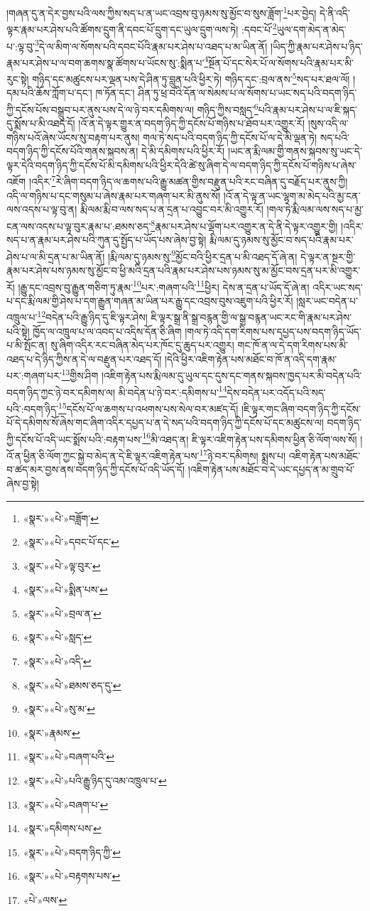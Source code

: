 །གཞན་དུ་ན་དེར་བྱས་པའི་ལས་ཀྱིས་སད་པ་ན་ཡང་འབྲས་བུ་ཉམས་སུ་མྱོང་བ་སུས་ཟློག་\footnote{«སྣར་»«པེ་»བཟློག་}པར་བྱེད། དེ་ནི་འདི་ལྟར་རྣམ་པར་ཤེས་པའི་ཚོགས་དྲུག་ནི་དབང་པོ་དྲུག་དང་ཡུལ་དྲུག་ལས་ཏེ། :དབང་པོ་\footnote{«སྣར་»«པེ་»དབང་པོ་དང་}ཡུལ་དག་མེད་ན་མེད་པ་:ལྟ་བུ་\footnote{«སྣར་»«པེ་»ལྟ་བུར་}དེ་ལ་མིག་ལ་སོགས་པའི་དབང་པོའི་རྣམ་པར་ཤེས་པ་འཐད་པ་མ་ཡིན་ནོ། །ཡིད་ཀྱི་རྣམ་པར་ཤེས་པ་ཉིད་རྣམ་པར་ཤེས་པ་ལ་བག་ཆགས་སྣ་ཚོགས་པ་ཡོངས་སུ་:སྨིན་པ་\footnote{«སྣར་»«པེ་»སྨིན་པས་}སྔོན་པོ་དང་སེར་པོ་ལ་སོགས་པའི་རྣམ་པར་མི་རུང་སྟེ། གཉིད་དང་མཚུངས་པར་ལྡན་པས་དེ་ཤིན་ཏུ་བླུན་པའི་ཕྱིར་ཏེ། གཉིད་དང་:བྲལ་ནས་\footnote{«སྣར་»«པེ་»བྲལ་ན་}སད་པར་ཐལ་ལོ། །དམ་པའི་ཆོས་ཀློག་པ་དང་། ཁ་ཏོན་དང་། ཤིན་ཏུ་ཕྲ་བའི་དོན་ལ་སེམས་པ་ལ་སོགས་པ་ཡང་སད་པའི་བདག་ཉིད་ཀྱི་དངོས་པོས་བསྒྲུབ་པར་ནུས་པས་དེ་ལ་ཉེ་བར་དམིགས་ལ། གཉིད་ཀྱིས་བསླད་\footnote{«སྣར་»«པེ་»སླད་}པའི་རྣམ་པར་ཤེས་པ་ལ་ཇི་སྐད་དུ་སྨོས་པ་མི་འཐད་དོ། །འོ་ན་དེ་ལྟར་གྱུར་ན་བདག་ཉིད་ཀྱི་དངོས་པོ་གཉིས་པ་ཐོབ་པར་འགྱུར་རོ། །སུས་འདི་ལ་གཉིས་པའོ་ཞེས་ཡོངས་སུ་བརྟག་པར་ནུས། གལ་ཏེ་སད་པའི་བདག་ཉིད་ཀྱི་དངོས་པོ་ལ་དེ་མི་ལྡན་ཏེ། སད་པའི་བདག་ཉིད་ཀྱི་དངོས་པོའི་གནས་སྐབས་ན། དེ་མི་དམིགས་པའི་ཕྱིར་རོ། །ཡང་ན་རྨི་ལམ་གྱི་གནས་སྐབས་སུ་ཡང་དེ་ལྟར་དེའི་བདག་ཉིད་ཀྱི་དངོས་པོ་མི་དམིགས་པའི་ཕྱིར་དེའི་ཚེ་སུ་ཞིག་དེ་ལ་བདག་ཉིད་ཀྱི་དངོས་པོ་གཉིས་པ་ཞེས་འཇོག །འདིར་\footnote{«སྣར་»«པེ་»འདི་}རེ་ཞིག་བདག་ཉིད་ལ་ཆགས་པའི་རྒྱུ་མཚན་གྱིས་བརྫུན་པའི་རང་བཞིན་དུ་བརྗོད་པར་ནུས་ཀྱི། འདི་ལ་གཉིས་པ་དང་གསུམ་པ་ཞེས་རྣམ་པར་གཞག་པར་མི་ནུས་སོ། །འོ་ན་དེ་ལྟ་ན་ཡང་ལྷག་མ་མེད་པའི་མྱ་ངན་ལས་འདས་པ་ལྟ་བུ་ན། རྨི་ལམ་རྨི་བ་ལས་སད་པ་ན་དྲན་པ་འབྱུང་བར་མི་འགྱུར་རོ། །གལ་ཏེ་རྨི་ལམ་ལས་སད་པ་མྱ་ངན་ལས་འདས་པ་ལྟ་བུར་རྣམ་པ་:ཐམས་ཅད་\footnote{«སྣར་»«པེ་»ཐམས་ཅད་དུ་}རྣམ་པར་ཤེས་པ་ལྡོག་པར་འགྱུར་ན་དེ་ནི་དེ་ལྟར་འགྱུར་གྱི། །འདིར་སད་པ་ན་རྣམ་པར་ཤེས་པའི་ཀུན་དུ་སྤྱོད་པ་ཡོད་པས་ཞེས་བྱ་སྟེ། རྨི་ལམ་དུ་ཉམས་སུ་མྱོང་བ་སད་པའི་རྣམ་པར་ཤེས་པ་ལ་མི་དྲན་པ་མ་ཡིན་ནོ། །རྨི་ལམ་དུ་ཉམས་སུ་\footnote{«སྣར་»«པེ་»སུ་མ་}མྱོང་བའི་ཕྱིར་དྲན་པ་མི་འཐད་དོ་ཞེ་ན། དེ་ལྟར་ན་སྔར་གྱི་རྣམ་པར་ཤེས་པས་ཉམས་སུ་མྱོང་བ་ཕྱི་མའི་དྲན་པའི་རྣམ་པར་ཤེས་པས་ཉམས་སུ་མ་མྱོང་བས་དྲན་པར་མི་འགྱུར་རོ། །རྒྱུ་དང་འབྲས་བུ་རྒྱུན་གཅིག་ཏུ་རྣམ་\footnote{«སྣར་»རྣམས་}པར་:གཞག་པའི་\footnote{«སྣར་»«པེ་»བཞག་པའི་}ཕྱིར། དེས་ན་དྲན་པ་ཡོད་དོ་ཞེ་ན། འདིར་ཡང་སད་པ་དང་རྨི་ལམ་གྱི་ཤེས་པ་དག་རྒྱུན་གཞན་མ་ཡིན་པར་རྒྱུ་དང་འབྲས་བུས་འཇུག་པའི་ཕྱིར་རོ། །སླར་ཡང་བདེན་པ་འཁྲུལ་པ་\footnote{«སྣར་»«པེ་»པའི་རྒྱུ་ཉིད་དུ་འམ་འཁྲུལ་པ་}བདེན་པའི་རྒྱུ་ཉིད་དུ་ཇི་ལྟར་ཤེས། ཇི་ལྟར་སྒྲ་ནི་སྒྲ་བརྙན་གྱི་ལ་སྒྲ་བརྙན་ཡང་རང་གི་རྣམ་པར་ཤེས་པའི་སྟེ། ཁྱོད་ལ་འཁྲུལ་པ་ལ་འབད་པ་འདིས་དོན་ཅི་ཞིག །གལ་ཏེ་འདི་དག་རིགས་པས་དཔྱད་པས་བདག་ཉིད་ཡོད་པ་མི་སྤོང་ན། སུ་ཞིག་འདིར་རང་བཞིན་མེད་པར་ཁོང་དུ་ཆུད་པར་འགྱུར། གང་ཁོ་ན་ལ་དེ་དག་རིགས་པས་མི་འཐད་པ་དེ་ཉིད་ཀྱིས་ན་དེ་ལ་བརྫུན་པར་འཐད་དོ། །དེའི་ཕྱིར་འཇིག་རྟེན་པས་མཐོང་བ་ཁོ་ན་འདི་དག་རྣམ་པར་:གཞག་པར་\footnote{«སྣར་»«པེ་»བཞག་པ་}གྱིས་ཤིག །འཇིག་རྟེན་པས་རྨི་ལམ་དུ་ཡུལ་དང་དུས་དང་གནས་སྐབས་ཁྱད་པར་མི་བདེན་པའི་བདག་ཉིད་ཀྱང་ཉེ་བར་དམིགས་ལ། མི་བདེན་པ་ཉེ་བར་:དམིགས་པ་\footnote{«སྣར་»དམིགས་པས་}དེས་བདེན་པར་འདོད་པའི་སད་པའི་:བདག་ཉིད་\footnote{«སྣར་»«པེ་»བདག་ཉིད་ཀྱི་}དངོས་པོ་ལ་ཆགས་པ་འཕགས་པས་སེལ་བར་མཛད་དོ། །ཇི་ལྟར་གང་ཞིག་བདག་ཉིད་ཀྱི་དངོས་པོ་དེ་དམིགས་སོ་ཞེས་གང་ཞིག་འདིར་དཔྱད་པ་ན་དེ་སད་པའི་བདག་ཉིད་ཀྱི་དངོས་པོ་དང་མཚུངས་ལ། བདག་ཉིད་ཀྱི་དངོས་པོ་འདི་ཡང་སྨོས་པའི་:བརྟག་པས་\footnote{«སྣར་»«པེ་»བརྟགས་པས་}མི་འཐད་ན། ཇི་ལྟར་འཇིག་རྟེན་པས་དམིགས་ཕྱིན་ཅི་ལོག་ལས་སོ། །འོ་ན་ཕྱིན་ཅི་ལོག་ཀྱང་སྐྱེ་བ་མེད་ན་དེ་ཇི་ལྟར་འཇིག་རྟེན་པས་\footnote{«པེ་»ལས་}ཉེ་བར་དམིགས། སྨྲས་པ། འཇིག་རྟེན་པས་མཐོང་བ་ཚད་མར་བྱས་ནས་བདག་ཉིད་ཀྱི་དངོས་པོ་འདི་ཡོད་དོ། །འཇིག་རྟེན་པས་མཐོང་བ་དེ་ཡང་དཔྱད་ན་མ་གྲུབ་པོ་ཞེས་བྱ་སྟེ། 